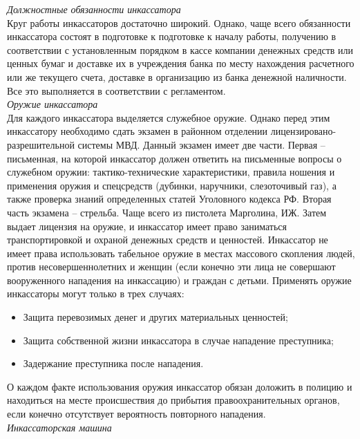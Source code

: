 \documentclass[a4paper,12pt,fleqn]{article} %
\begin{document}
\textit{Должностные обязанности инкассатора}\\

Круг работы инкассаторов достаточно широкий. Однако, чаще всего обязанности инкассатора состоят в подготовке к подготовке к началу работы, получению в соответствии с установленным порядком в кассе компании денежных средств или ценных бумаг и доставке их в учреждения банка по месту нахождения расчетного или же текущего счета, доставке в организацию из банка денежной наличности. Все это выполняется в соответствии с регламентом.\\

\textit{Оружие инкассатора}\\

Для каждого инкассатора выделяется служебное оружие. Однако перед этим инкассатору необходимо сдать экзамен в районном отделении лицензировано-разрешительной системы МВД. Данный экзамен имеет две части. Первая – письменная, на которой инкассатор должен ответить на письменные вопросы о служебном оружии: тактико-технические характеристики, правила ношения и применения оружия и спецсредств (дубинки, наручники, слезоточивый газ), а также проверка знаний определенных статей Уголовного кодекса РФ. Вторая часть экзамена – стрельба. Чаще всего из пистолета Марголина, ИЖ. Затем выдает лицензия на оружие, и инкассатор имеет право заниматься транспортировкой и охраной денежных средств и ценностей. Инкассатор не имеет права использовать табельное оружие в местах массового скопления людей, против несовершеннолетних и женщин (если конечно эти лица не совершают вооруженного нападения на инкассацию) и граждан с детьми. Применять оружие инкассаторы могут только в трех случаях:

\begin{itemize}
	\item Защита перевозимых денег и других материальных ценностей;
	\item Защита собственной жизни инкассатора в случае нападение преступника;
	\item Задержание преступника после нападения.
\end{itemize}

О каждом факте использования оружия инкассатор обязан доложить в полицию и находиться на месте происшествия до прибытия правоохранительных органов, если конечно отсутствует вероятность повторного нападения.\\

\textit{Инкассаторская машина}\\
\end{document}
